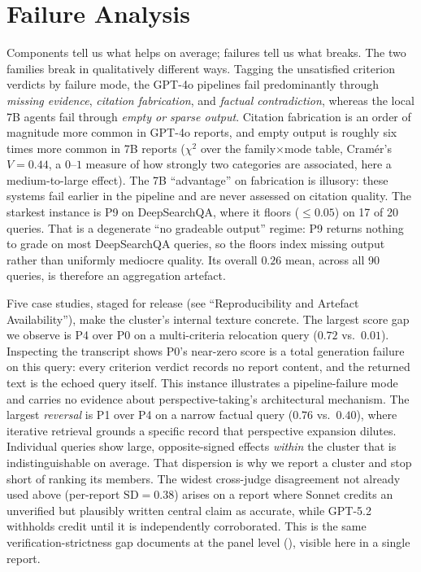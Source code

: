 \documentclass[11pt]{article}
\begin{document}
\section{Failure Analysis}\label{sec:failures}
Components tell us what helps on average; failures tell us what breaks. The two
families break in qualitatively different ways. Tagging the unsatisfied
criterion verdicts by failure mode, the GPT-4o pipelines fail predominantly through
\emph{missing evidence}, \emph{citation fabrication}, and \emph{factual contradiction},
whereas the local 7B agents fail through \emph{empty or sparse output}. Citation
fabrication is an order of magnitude more common in GPT-4o reports, and empty output is
roughly six times more common in 7B reports ($\chi^2$ over the family$\times$mode
table, Cram\'er's $V=0.44$, a $0$--$1$ measure of how strongly two categories are associated,
here a medium-to-large effect). The 7B ``advantage'' on fabrication is
illusory: these systems fail earlier in the pipeline and are never assessed on citation
quality. The starkest instance is P9 on DeepSearchQA, where it floors ($\leq0.05$) on
17 of 20 queries. That is a degenerate ``no gradeable output'' regime: P9 returns
nothing to grade on most DeepSearchQA queries, so the floors index missing output rather
than uniformly mediocre quality. Its overall $0.26$ mean, across all 90 queries,
is therefore an aggregation artefact.

Five case studies, staged for release (see ``Reproducibility and Artefact
Availability''), make the cluster's internal texture concrete. The largest score gap we
observe is P4 over P0 on a multi-criteria relocation query ($0.72$ vs.\ $0.01$).
Inspecting the transcript shows P0's near-zero score is a total generation failure on
this query: every criterion verdict records no report content, and the returned text is
the echoed query itself. This instance illustrates a pipeline-failure mode and carries no
evidence about perspective-taking's architectural mechanism. The largest
\emph{reversal} is P1 over P4 on a narrow factual query
($0.76$ vs.\ $0.40$), where iterative retrieval grounds a specific record that
perspective expansion dilutes. Individual queries show large, opposite-signed effects
\emph{within} the cluster that is indistinguishable on average. That dispersion is why we
report a cluster and stop short of ranking its members.
The widest cross-judge disagreement not already used above
(per-report $\text{SD}=0.38$) arises on a report where Sonnet credits an unverified but
plausibly written central claim as accurate, while GPT-5.2 withholds credit until it is
independently corroborated. This is the same verification-strictness gap
 documents at the panel level (), visible here in
a single report.
\end{document}
